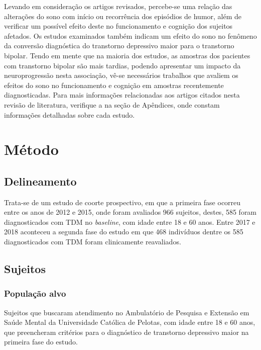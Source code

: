 \documentclass[chapter=TITLE,
               oneside,
               12pt,
               a4paper,
               english,
               brazil]{abntex2}    %
\begin{document}
        Levando em consideração os artigos revisados, percebe-se uma relação
        das alterações do sono com início ou recorrência dos episódios de humor,
        além de verificar um possível efeito deste no funcionamento e cognição
        dos sujeitos afetados.
        Os estudos examinados também indicam um efeito do sono no fenômeno
        da conversão diagnóstica do transtorno depressivo maior para o transtorno
        bipolar.
        Tendo em mente que na maioria dos estudos, as amostras dos pacientes
        com transtorno bipolar são mais tardias, podendo apresentar um impacto
        da neuroprogressão nesta associação, vê-se necessários trabalhos que
        avaliem os efeitos do sono no funcionamento e cognição em amostras recentemente
        diagnosticadas.
        Para mais informações relacionadas aos artigos citados nesta revisão
        de literatura, verifique a  na seção de Apêndices,
        onde constam informações detalhadas sobre cada estudo.

\vspace{\onelineskip}
\chapter{Método}\label{sec:metodo}

    \section{Delineamento}\label{sec:delineamento}

        Trata-se de um estudo de coorte prospectivo, em que a primeira fase ocorreu
        entre os anos de 2012 e 2015, onde foram avaliados 966 sujeitos, destes, 585
        foram diagnosticados com TDM no \textit{baseline}, com idade entre 18 e 60 anos.
        Entre 2017 e 2018 aconteceu a segunda fase do estudo em que 468 indivíduos dentre
        os 585 diagnosticados com TDM foram clinicamente reavaliados.

    \section{Sujeitos}\label{sec:sujeitos}

        \subsection{População alvo}

            Sujeitos que buscaram atendimento no Ambulatório de Pesquisa e Extensão
            em Saúde Mental da Universidade Católica de Pelotas, com idade entre 18
            e 60 anos, que preencheram critérios para o diagnóstico de transtorno
            depressivo maior na primeira fase do estudo.
\end{document}
